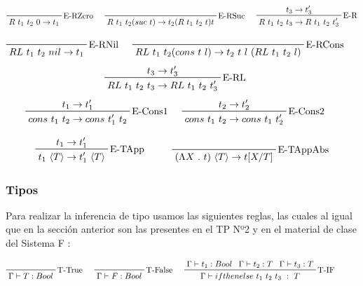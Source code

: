 \documentclass[12pt, titlepage, a4paper]{article}
\begin{document}
\begin{displaymath}
    \prftree[r]{E-RZero}{R \ t_1 \ t_2 \ 0 \rightarrow t_1} \hspace{0.5cm}
    \prftree[r]{E-RSuc}{R \ t_1 \ t_2 (suc \ t) \rightarrow t_2 (R \ t_1 \ t_2 \ t) t} \hspace{0.5cm}
    \prftree[r]{E-R}{t_3 \rightarrow t_3'}{R \ t_1 \ t_2 \ t_3 \rightarrow R \ t_1 \ t_2 \ t_3'}
\end{displaymath}


\begin{displaymath}
    \prftree[r]{E-RNil}{RL \ t_1 \ t_2 \ nil \rightarrow t_1} \hspace{0.5cm}
    \prftree[r]{E-RCons}{RL \ t_1 \ t_2 (cons \ t \ l) \rightarrow t_2 \ t \ l \ (RL \ t_1 \ t_2 \ l)} \hspace{0.5cm}
\end{displaymath}
\begin{displaymath}
    \prftree[r]{E-RL}{t_3 \rightarrow t_3'}{RL \ t_1 \ t_2 \ t_3 \rightarrow RL \ t_1 \ t_2 \ t_3'} \hspace{0.5cm}
\end{displaymath}
\begin{displaymath}
  \prftree[r]{E-Cons1}{t_1 \rightarrow t_1'}{cons \ t_1 \ t_2 \rightarrow cons \ t_1' \ t_2} \hspace{0.5cm}
  \prftree[r]{E-Cons2}{t_2 \rightarrow t_2'}{cons \ t_1 \ t_2 \rightarrow cons \ t_1 \ t_2'} \hspace{0.5cm}
\end{displaymath}


\begin{displaymath}
    \prftree[r]{E-TApp}{t_1 \rightarrow t_1'}{t_1 \ \langle T \rangle \rightarrow t_1' \ \langle T \rangle} \hspace{1cm}
    \prftree[r]{E-TAppAbs}{(\Lambda X \ . \ t)\ \langle T \rangle \rightarrow t[X/T]}
\end{displaymath}

\subsubsection{Tipos}
Para realizar la inferencia de tipo usamos las siguientes reglas, las cuales al igual que en la sección anterior son las
presentes en el TP Nº2 \cite{tp2:lambdaCalculoSimpleTipado} y en el material de clase del Sistema F \cite{ALP:Polimorfismo}:

\begin{displaymath}
    \prftree[r]{T-True}{\Gamma \vdash T: Bool} \hspace{0.5cm}
    \prftree[r]{T-False}{\Gamma \vdash F:  Bool} \hspace{0.5cm}  
    \prftree[r]{T-IF}{\Gamma \vdash t_1 : Bool}{\Gamma \vdash t_2 : T}{\Gamma \vdash t_3 : T}{\Gamma \vdash ifthenelse \ t_1 \ t_2 \ t_3 \ : \ T} \hspace{1cm}
\end{displaymath}
\end{document}
